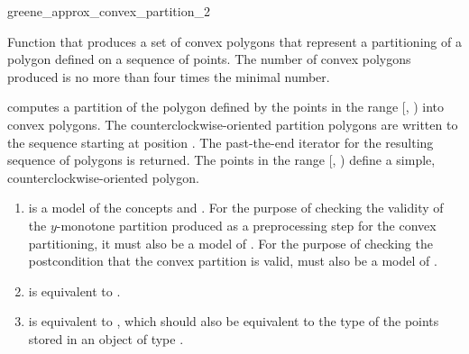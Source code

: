 \begin{ccRefFunction}{greene_approx_convex_partition_2}

\ccDefinition
Function that produces a set of 
convex polygons that represent a partitioning of a polygon defined
on a sequence of points.
The number of convex polygons produced is 
no more than four times the minimal number.%


{
computes a partition of the polygon defined 
by the points in the range [, ) into convex 
polygons. The counterclockwise-oriented partition polygons are written to
the sequence starting at position .  The past-the-end iterator for 
the resulting sequence of polygons is returned.
\ccPrecond The points in the range [, ) define a simple,
counterclockwise-oriented polygon.
}

\begin{enumerate}
    \item {} is a model of the concepts 
          and .
          For the purpose of 
          checking the validity of the $y$-monotone partition produced as
          a preprocessing step for the convex partitioning, it must also 
          be a model of .
          For the purpose of checking
          the postcondition that the convex partition is valid, 
          must also be a model of .
    \item {} is equivalent to 
          .
    \item {} is equivalent to 
          ,
          which should also be equivalent to the type of the points stored in 
          an object of type .
\end{enumerate}


\end{ccRefFunction}
